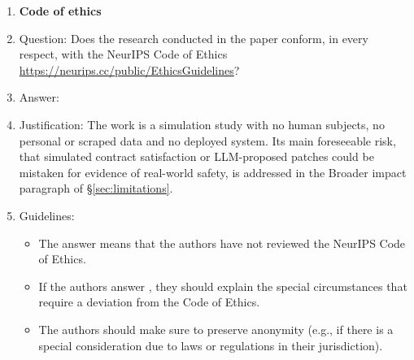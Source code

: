 \begin{enumerate}
\item {\bf Code of ethics}
    \item[] Question: Does the research conducted in the paper conform, in every respect, with the NeurIPS Code of Ethics \url{https://neurips.cc/public/EthicsGuidelines}?
    \item[] Answer: \answerYes{}
    \item[] Justification: The work is a simulation study with no human subjects, no personal or scraped data and no deployed system. Its main foreseeable risk, that simulated contract satisfaction or LLM-proposed patches could be mistaken for evidence of real-world safety, is addressed in the Broader impact paragraph of \S\ref{sec:limitations}.
    \item[] Guidelines:
    \begin{itemize}
        \item The answer \answerNA{} means that the authors have not reviewed the NeurIPS Code of Ethics.
        \item If the authors answer \answerNo{}, they should explain the special circumstances that require a deviation from the Code of Ethics.
        \item The authors should make sure to preserve anonymity (e.g., if there is a special consideration due to laws or regulations in their jurisdiction).
    \end{itemize}


\end{enumerate}
